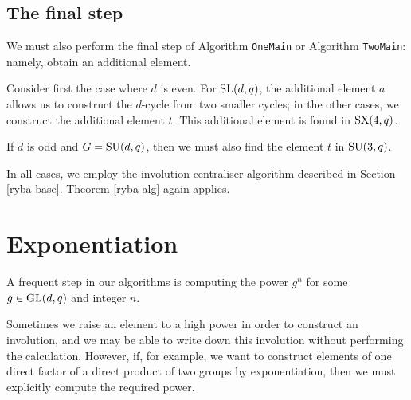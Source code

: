 \documentclass[12pt]{article}
\def\SL{{\rm SL}}
\def\GL{{\rm GL}}
\def\SU{{\rm SU}}
\def\SX{{\rm SX}}
\begin{document}
\subsection{The final step}\label{final-step}
We must also perform the final step 
of Algorithm {\tt OneMain} or Algorithm {\tt TwoMain}:
namely, obtain an additional element. 

Consider first the case where $d$ is even. 
For $\SL(d, q)$, the additional element $a$ allows
us to construct the $d$-cycle from two smaller cycles; 
in the other cases, we construct the additional element $t$.
This additional element is found in $\SX(4, q)$.

If $d$ is odd and $G = \SU(d, q)$, 
then we must also find the element
$t$ in $\SU(3, q)$. 

In all cases, we employ the involution-centraliser algorithm described 
in Section \ref{ryba-base}. Theorem \ref{ryba-alg} again applies.

\section{Exponentiation}
\label{Exp}

A frequent step in our algorithms is computing the 
power $g^n$ for some $g\in \GL(d,q)$ and integer $n$.

Sometimes we raise an element to a high power in order to construct an
involution, and we may be able to write down
this involution without performing the calculation. However, if, for example, 
we want to construct elements of one direct factor of a direct product 
of two groups by exponentiation, then we must explicitly
compute the required power. 
\end{document}
